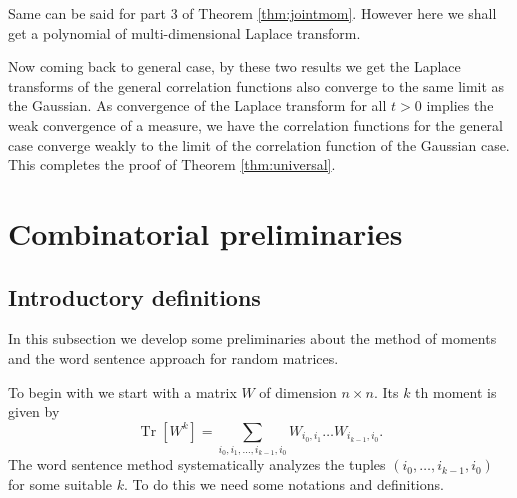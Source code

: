 \documentclass[12pt]{article}
\numberwithin{equation}{section}
\numberwithin{equation}{section}
\theoremstyle{definition}
\DeclareMathOperator{\Tr}{Tr}
\renewcommand{\1}{\bf 1}
\begin{document}
\noindent
Same can be said for part 3 of Theorem \ref{thm:jointmom}. However here we shall get a polynomial of multi-dimensional Laplace transform. 

\noindent 
Now coming back to general case, by these two results we get the Laplace transforms of the general correlation functions also converge to the same limit as the Gaussian. As convergence of the Laplace transform for all $t>0$ implies the weak convergence of a measure, we have the correlation functions for the general case converge weakly to the limit of the correlation function of the Gaussian case. This completes the proof of Theorem \ref{thm:universal}.  
\section{Combinatorial preliminaries}\label{sec:word}
\subsection{Introductory definitions}
In this subsection we develop some preliminaries about the method of moments and the word sentence approach for random matrices.

To begin with we start with a matrix $W$ of dimension $n \times n$. Its $k$ th moment is given by 
\begin{equation}\label{eq:traceexpression}
\Tr[W^{k}]= \sum_{i_{0},i_{1},\ldots ,i_{k-1}, i_{0}} W_{i_{0},i_{1}}\ldots W_{i_{k-1},i_{0}}.
\end{equation} 
The word sentence method systematically analyzes the tuples $(i_{0}, \ldots, i_{k-1},i_{0})$ for some suitable $k$. To do this we need some notations and definitions.
\label{subsec:word}
 
\end{document}
